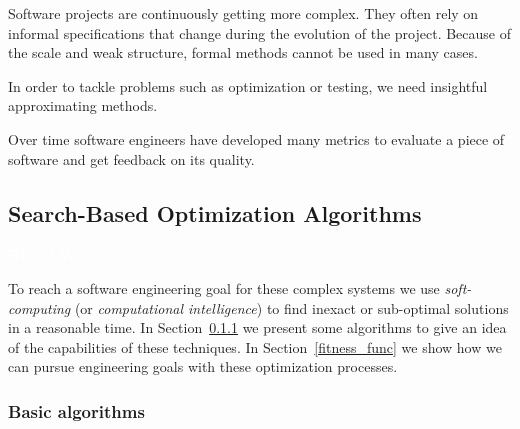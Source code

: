 \documentclass[11pt]{sdm}
\newcommand{\review}{\colorbox{YellowOrange!100}{\textcolor{white}{\textbf{REVIEW}}}}
\begin{document}
Software projects are continuously getting more complex.
They often rely on informal specifications that change during the evolution of the project.
Because of the scale and weak structure, formal methods cannot be used in many cases.

In order to tackle problems such as optimization or testing, we need insightful approximating methods.

Over time software engineers have developed many metrics to evaluate a piece of software and get feedback on its quality.

\subsection{Search-Based Optimization Algorithms}
\label{example_algo}
\review{}

To reach a software engineering goal for these complex systems we use \textit{soft-computing} (or \textit{computational intelligence}) to find inexact or sub-optimal solutions in a reasonable time.
In Section~\ref{basic_algo} we present some algorithms to give an idea of the capabilities of these techniques.
In Section~\ref{fitness_func} we show how we can pursue engineering goals with these optimization processes.

\subsubsection{Basic algorithms}
\label{basic_algo}
\end{document}
